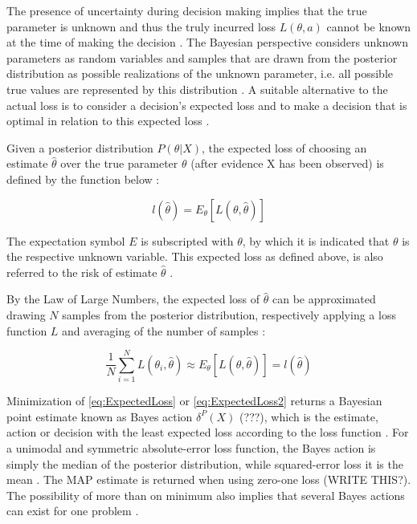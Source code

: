         The presence of uncertainty during decision making implies that the true parameter is unknown and thus the truly incurred loss $L(\theta,a)$ cannot be known at the time of making the decision \citep{berger2013stat, davidson2015}. The Bayesian perspective considers unknown parameters as random variables and samples that are drawn from the posterior distribution as possible realizations of the unknown parameter, i.e. all possible true values are represented by this distribution \citep{davidson2015}. A suitable alternative to the actual loss is to consider a decision's expected loss and to make a decision that is optimal in relation to this expected loss \citep{berger2013stat}. 
        
        Given a posterior distribution $P(\theta|X)$, the expected loss of choosing an estimate $\hat{\theta}$ over the true parameter $\theta$ (after evidence X has been observed) is defined by the function below \citep{davidson2015}:
        
        \begin{equation}\label{eq:ExpectedLoss}
        l(\hat{\theta}) = E_{\theta}[L(\theta,\hat{\theta})]
        \end{equation}  
        
        The expectation symbol $E$ is subscripted with $\theta$, by which it is indicated that $\theta$ is the respective unknown variable. This expected loss as defined above, is also referred to the risk of estimate $\hat{\theta}$ \citep{davidson2015}.
        
        By the Law of Large Numbers, the expected loss of $\hat{\theta}$ can be approximated drawing $N$ samples from the posterior distribution, respectively applying a loss function $L$ and averaging of the number of samples \citep{davidson2015}:
        
        \begin{equation}\label{eq:ExpectedLoss2}
        \frac{1}{N}\sum_{i=1}^{N} L(\theta_i,\hat{\theta}) \approx E_{\theta}[L(\theta,\hat{\theta})] = l(\hat{\theta})
        \end{equation}
        
        Minimization of \ref{eq:ExpectedLoss} or \ref{eq:ExpectedLoss2} returns a Bayesian point estimate known as Bayes action $\delta^P(X)$ (???), which is the estimate, action or decision with the least expected loss according to the loss function \citep{berger2013stat}. For a unimodal and symmetric absolute-error loss function, the Bayes action is simply the median of the posterior distribution, while squared-error loss it is the mean \citep{davidson2015, berger2013stat}. The MAP estimate is returned when using zero-one loss \citep{davidson2015}  (WRITE THIS?). The possibility of more than on minimum also implies that several Bayes actions can exist for one problem \citep{berger2013stat}.
        
